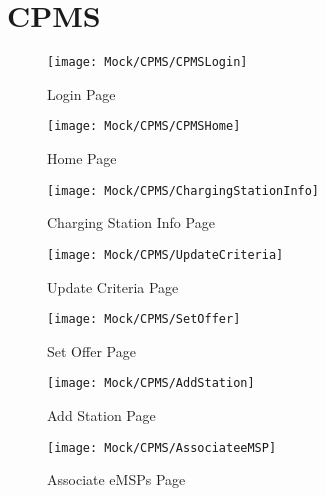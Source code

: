 \section{CPMS}

\begin{figure}[H]
    \begin{center}
    \texttt{[image: Mock/CPMS/CPMSLogin]}
    \caption{Login Page}
    \label{fig:CPMSLogin}
    \end{center}
\end{figure}

\begin{figure}[H]
    \begin{center}
    \texttt{[image: Mock/CPMS/CPMSHome]}
    \caption{Home Page}
    \label{fig:CPMSHome}
    \end{center}
\end{figure}

\begin{figure}[H]
    \begin{center}
    \texttt{[image: Mock/CPMS/ChargingStationInfo]}
    \caption{Charging Station Info Page}
    \label{fig:ChargingStationInfo}
    \end{center}
\end{figure}

\begin{figure}[H]
    \begin{center}
    \texttt{[image: Mock/CPMS/UpdateCriteria]}
    \caption{Update Criteria Page}
    \label{fig:CPMSLogin}
    \end{center}
\end{figure}

\begin{figure}[H]
    \begin{center}
    \texttt{[image: Mock/CPMS/SetOffer]}
    \caption{Set Offer Page}
    \label{fig:SetOffer}
    \end{center}
\end{figure}

\begin{figure}[H]
    \begin{center}
    \texttt{[image: Mock/CPMS/AddStation]}
    \caption{Add Station Page}
    \label{fig:AddStation}
    \end{center}
\end{figure}

\begin{figure}[H]
    \begin{center}
    \texttt{[image: Mock/CPMS/AssociateeMSP]}
    \caption{Associate eMSPs Page}
    \label{fig:AssociateeMSP}
    \end{center}
\end{figure}